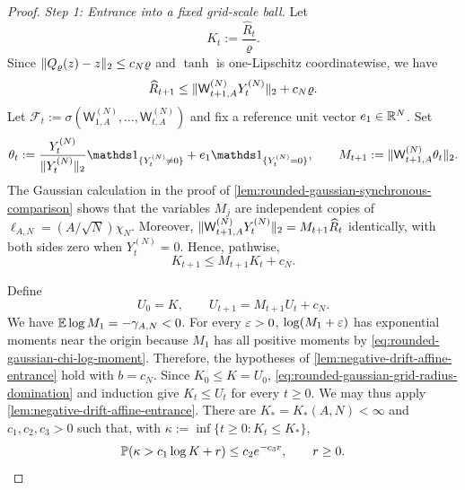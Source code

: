 \documentclass[11pt,reqno,a4paper]{article}
\newcommand{\Pp}{\P}
\newcommand{\Ee}{\E}
\begin{document}
\begin{proof}
  \emph{Step 1: Entrance into a fixed grid-scale ball.}
  Let
  \begin{equation*}
    K_t:=\frac{\widehat R_t}{\varrho}.
  \end{equation*}
  Since $\lVert Q_\varrho(z)-z\rVert_2\leq c_N\varrho$ and $\tanh$ is one-Lipschitz
  coordinatewise, we have
  \begin{equation*}
    \widehat R_{t+1}
    \leq
    \lVert\mathsf W_{t+1,A}^{(N)}Y_t^{(N)}\rVert_2+c_N\varrho.
  \end{equation*}
  Let $\mathcal F_t:=\sigma(\mathsf W_{1,A}^{(N)},\ldots,\mathsf W_{t,A}^{(N)})$
  and fix a reference unit vector $e_1\in\mathbb{R}^N$. Set
  \begin{equation*}
    \theta_t
    :=
    \frac{Y_t^{(N)}}{\norm{Y_t^{(N)}}_2}\one_{\{Y_t^{(N)}\neq0\}}
    +e_1\one_{\{Y_t^{(N)}=0\}},
    \qquad
    M_{t+1}:=\norm{\mathsf W_{t+1,A}^{(N)}\theta_t}_2 .
  \end{equation*}
  The Gaussian calculation in the proof of
  \cref{lem:rounded-gaussian-synchronous-comparison} shows that the variables
  $M_j$ are independent copies of
  $\ell_{A,N}=(A/\sqrt N)\chi_N$. Moreover,
  $\lVert\mathsf W_{t+1,A}^{(N)}Y_t^{(N)}\rVert_2=M_{t+1}\widehat R_t$ identically,
  with both sides zero when $Y_t^{(N)}=0$. Hence, pathwise,
  \begin{equation}\label{eq:rounded-gaussian-grid-radius-domination}
    K_{t+1}
    \leq
    M_{t+1}K_t+c_N .
  \end{equation}

  Define
  \begin{equation*}
    U_0=K,
    \qquad
    U_{t+1}=M_{t+1}U_t+c_N .
  \end{equation*}
  We have $\Ee\log M_1=-\gamma_{A,N}<0$. For every $\varepsilon>0$,
  $\log(M_1+\varepsilon)$ has exponential moments near the origin because $M_1$ has
  all positive moments by \cref{eq:rounded-gaussian-chi-log-moment}. Therefore,
  the hypotheses of \cref{lem:negative-drift-affine-entrance} hold with
  $b=c_N$.
  Since $K_0\leq K=U_0$,
  \cref{eq:rounded-gaussian-grid-radius-domination} and induction give
  $K_t\leq U_t$ for every $t\geq0$. We may thus apply
  \cref{lem:negative-drift-affine-entrance}. There are
  $K_\ast=K_\ast(A,N)<\infty$ and $c_1,c_2,c_3>0$ such that,
  with $\kappa:=\inf\{t\geq0:K_t\leq K_\ast\}$,
  \begin{equation}\label{eq:rounded-gaussian-grid-entrance}
    \Pp\left(\kappa>c_1\log K+r\right)
    \leq
    c_2e^{-c_3r},
    \qquad r\geq0.
  \end{equation}


\end{proof}
\end{document}

